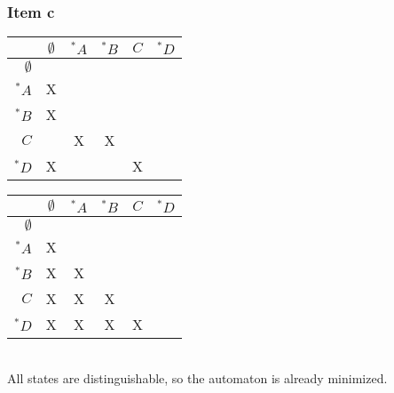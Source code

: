 {\begin{center}
\end{center}
\subsubsection{Item c}
\begin{minipage}[c]{0.49\textwidth}
	\begin{center}
		\begin{tabular}{r || c | c | c | c | c}
						& $\emptyset$ & $^* A$ & $^* B$ & $C$ & $^* D$ \\ \hline \hline
			$\emptyset$ & \cellcolor{gray} & \cellcolor{gray}    & \cellcolor{gray}    & \cellcolor{gray}    & \cellcolor{gray}    \\ \hline
			$     ^* A$ & X           & \cellcolor{gray}    & \cellcolor{gray}    & \cellcolor{gray}    & \cellcolor{gray}    \\ \hline
			$     ^* B$ & X           &     &  \cellcolor{gray}   & \cellcolor{gray}    & \cellcolor{gray}    \\ \hline
			$        C$ &             & X   & X   & \cellcolor{gray}    & \cellcolor{gray}    \\ \hline
			$     ^* D$ & X           &     &     & X   & \cellcolor{gray}    
		\end{tabular}
	\end{center}
\end{minipage}
\begin{minipage}[c]{0.49\textwidth}
	\begin{center}
		\begin{tabular}{r || c | c | c | c | c}
						& $\emptyset$ & $^* A$ & $^* B$ & $C$ & $^* D$ \\ \hline \hline
			$\emptyset$ & \cellcolor{gray} & \cellcolor{gray}    & \cellcolor{gray}    & \cellcolor{gray}    & \cellcolor{gray}    \\ \hline
			$     ^* A$ & X           & \cellcolor{gray}    & \cellcolor{gray}    & \cellcolor{gray}    & \cellcolor{gray}    \\ \hline
			$     ^* B$ & X           & X   &  \cellcolor{gray}   & \cellcolor{gray}    & \cellcolor{gray}    \\ \hline
			$        C$ & X           & X   & X   & \cellcolor{gray}    & \cellcolor{gray}    \\ \hline
			$     ^* D$ & X           & X   & X   & X   & \cellcolor{gray}    
		\end{tabular}
	\end{center}
\end{minipage} \vspace*{1em} \\
All states are distinguishable, so the automaton is already minimized.
\pagebreak
}
